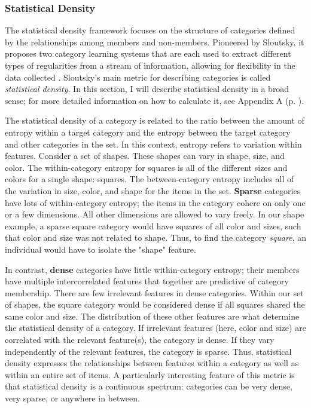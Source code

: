 \documentclass[../dissertation.tex]{subfiles}
\begin{document}
\subsubsection{Statistical Density}

The statistical density framework focuses on the structure of categories defined by the relationships among members and non-members. Pioneered by Sloutsky, it proposes two category learning systems that are each used to extract different types of regularities from a stream of information, allowing for flexibility in the data collected \citep{Sloutsky2010}. Sloutsky's main metric for describing categories is called \textit{statistical density}. In this section, I will describe statistical density in a broad sense; for more detailed information on how to calculate it, see Appendix A (p. \pageref{appendixA}). \par
	The statistical density of a category is related to the ratio between the amount of entropy within a target category and the entropy between the target category and other categories in the set. In this context, entropy refers to variation within features. Consider a set of shapes. These shapes can vary in shape, size, and color. The within-category entropy for squares is all of the different sizes and colors for a single shape: squares. The between-category entropy includes all of the variation in size, color, and shape for the items in the set. \textbf{Sparse} categories have lots of within-category entropy; the items in the category cohere on only one or a few dimensions. All other dimensions are allowed to vary freely. In our shape example, a sparse square category would have squares of all color and sizes, such that color and size was not related to shape. Thus, to find the category \textit{square}, an individual would have to isolate the "shape" feature. \par
	In contrast, \textbf{dense} categories have little within-category entropy; their members have multiple intercorrelated features that together are predictive of category membership. There are few irrelevant features in dense categories. Within our set of shapes, the square category would be considered dense if all squares shared the same color and size. The distribution of these other features are what determine the statistical density of a category. If irrelevant features (here, color and size) are correlated with the relevant feature(s), the category is dense. If they vary independently of the relevant features, the category is sparse. Thus, statistical density expresses the relationships between features within a category as well as within an entire set of items. A particularly interesting feature of this metric is that statistical density is a continuous spectrum: categories can be very dense, very sparse, or anywhere in between. \par 
\end{document}
